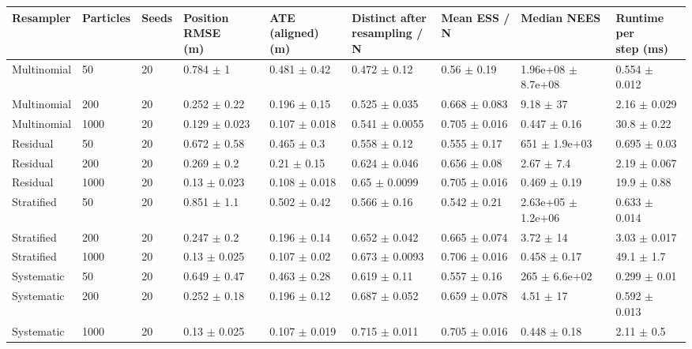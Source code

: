 \begin{tabular}{lllllllll}
\toprule
Resampler & Particles & Seeds & \shortstack[l]{Position RMSE\\(m)} & \shortstack[l]{ATE (aligned)\\(m)} & \shortstack[l]{Distinct after\\resampling / N} & Mean ESS / N & Median NEES & \shortstack[l]{Runtime per\\step (ms)} \\
\midrule
Multinomial & 50 & 20 & 0.784 $\pm$ 1 & 0.481 $\pm$ 0.42 & 0.472 $\pm$ 0.12 & 0.56 $\pm$ 0.19 & 1.96e+08 $\pm$ 8.7e+08 & 0.554 $\pm$ 0.012 \\
Multinomial & 200 & 20 & 0.252 $\pm$ 0.22 & 0.196 $\pm$ 0.15 & 0.525 $\pm$ 0.035 & 0.668 $\pm$ 0.083 & 9.18 $\pm$ 37 & 2.16 $\pm$ 0.029 \\
Multinomial & 1000 & 20 & 0.129 $\pm$ 0.023 & 0.107 $\pm$ 0.018 & 0.541 $\pm$ 0.0055 & 0.705 $\pm$ 0.016 & 0.447 $\pm$ 0.16 & 30.8 $\pm$ 0.22 \\
Residual & 50 & 20 & 0.672 $\pm$ 0.58 & 0.465 $\pm$ 0.3 & 0.558 $\pm$ 0.12 & 0.555 $\pm$ 0.17 & 651 $\pm$ 1.9e+03 & 0.695 $\pm$ 0.03 \\
Residual & 200 & 20 & 0.269 $\pm$ 0.2 & 0.21 $\pm$ 0.15 & 0.624 $\pm$ 0.046 & 0.656 $\pm$ 0.08 & 2.67 $\pm$ 7.4 & 2.19 $\pm$ 0.067 \\
Residual & 1000 & 20 & 0.13 $\pm$ 0.023 & 0.108 $\pm$ 0.018 & 0.65 $\pm$ 0.0099 & 0.705 $\pm$ 0.016 & 0.469 $\pm$ 0.19 & 19.9 $\pm$ 0.88 \\
Stratified & 50 & 20 & 0.851 $\pm$ 1.1 & 0.502 $\pm$ 0.42 & 0.566 $\pm$ 0.16 & 0.542 $\pm$ 0.21 & 2.63e+05 $\pm$ 1.2e+06 & 0.633 $\pm$ 0.014 \\
Stratified & 200 & 20 & 0.247 $\pm$ 0.2 & 0.196 $\pm$ 0.14 & 0.652 $\pm$ 0.042 & 0.665 $\pm$ 0.074 & 3.72 $\pm$ 14 & 3.03 $\pm$ 0.017 \\
Stratified & 1000 & 20 & 0.13 $\pm$ 0.025 & 0.107 $\pm$ 0.02 & 0.673 $\pm$ 0.0093 & 0.706 $\pm$ 0.016 & 0.458 $\pm$ 0.17 & 49.1 $\pm$ 1.7 \\
Systematic & 50 & 20 & 0.649 $\pm$ 0.47 & 0.463 $\pm$ 0.28 & 0.619 $\pm$ 0.11 & 0.557 $\pm$ 0.16 & 265 $\pm$ 6.6e+02 & 0.299 $\pm$ 0.01 \\
Systematic & 200 & 20 & 0.252 $\pm$ 0.18 & 0.196 $\pm$ 0.12 & 0.687 $\pm$ 0.052 & 0.659 $\pm$ 0.078 & 4.51 $\pm$ 17 & 0.592 $\pm$ 0.013 \\
Systematic & 1000 & 20 & 0.13 $\pm$ 0.025 & 0.107 $\pm$ 0.019 & 0.715 $\pm$ 0.011 & 0.705 $\pm$ 0.016 & 0.448 $\pm$ 0.18 & 2.11 $\pm$ 0.5 \\
\bottomrule
\end{tabular}
